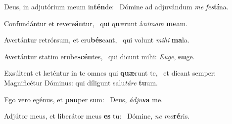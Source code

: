 \item Deus, in adjutórium meum in\textbf{tén}de:~\psstar{} Dómine ad adjuvándum \textit{me} \textit{fes}\textbf{tí}na.
\item Confundántur et revere\textbf{án}\-tur,~\psstar{} qui quærunt á\textit{nimam} \textbf{me}am.
\item Avertántur retrórsum, et eru\textbf{bés}cant,~\psstar{} qui volunt \textit{mihi} \textbf{ma}la.
\item Avertántur statim erube\textbf{scén}\-tes,~\psstar{} qui dicunt mihi: \textit{Euge}, \textbf{eu}ge.
\item Exsúltent et læténtur in te omnes qui \textbf{quæ}runt te,~\psstar{} et dicant semper: Magnificétur Dóminus: qui díligunt salu\textit{táre} \textbf{tu}um.
\item Ego vero egénus, et \textbf{pau}per sum:~\psstar{} Deus, \textit{ádju}\textbf{va} me.
\item Adjútor meus, et liberátor meus \textbf{es} tu:~\psstar{} Dómine, \textit{ne} \textit{mo}\textbf{ré}ris.
